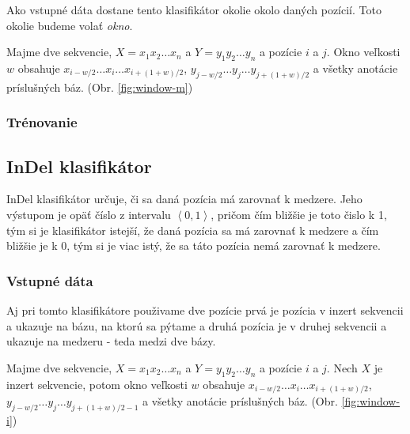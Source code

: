 Ako vstupné dáta dostane tento klasifikátor okolie okolo daných pozícií. Toto okolie budeme volať \textit{okno}.

Majme dve sekvencie, $X = x_1 x_2 \dots x_n$ a $Y = y_1 y_2 \dots y_n$ a pozície $i$ a $j$. Okno veľkosti $w$ obsahuje $x_{i - w/2}\dots x_i \dots x_{i + (1 + w)/2}$, $y_{j - w/2}\dots y_j \dots y_{j + (1 + w)/2}$ a všetky anotácie príslušných báz. (Obr. \ref{fig:window-m})


\subsubsection{Trénovanie}

\todo

\subsection{InDel klasifikátor}

InDel klasifikátor určuje, či sa daná pozícia má zarovnať k medzere. Jeho výstupom je opäť  číslo z intervalu $\left<0,1\right>$, pričom čím bližšie je toto čislo k 1, tým si je klasifikátor istejší, že daná pozícia sa má zarovnať k medzere a čím bližšie je k 0, tým si je viac istý, že sa táto pozícia nemá zarovnať k medzere.

\subsubsection{Vstupné dáta}
Aj pri tomto klasifikátore použivame dve pozície prvá je pozícia v inzert sekvencii a ukazuje na bázu, na ktorú sa pýtame a druhá pozícia je v druhej sekvencii a ukazuje na medzeru - teda medzi dve bázy.

Majme dve sekvencie, $X = x_1 x_2 \dots x_n$ a $Y = y_1 y_2 \dots y_n$ a pozície $i$ a $j$. Nech $X$ je inzert sekvencie, potom okno veľkosti $w$ obsahuje $x_{i - w/2}\dots x_i \dots x_{i + (1 + w)/2}$, $y_{j - w/2}\dots y_j \dots y_{j + (1 + w)/2 - 1}$ a všetky anotácie príslušných báz. (Obr. \ref{fig:window-i})


